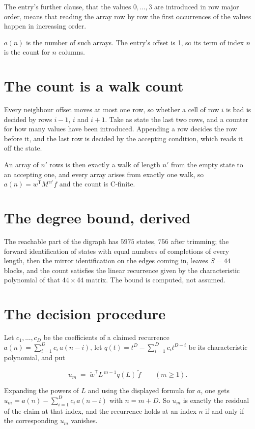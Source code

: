 \documentclass[11pt]{article}
\theoremstyle{definition}
\begin{document}
The entry's further clause, that the values $0,\dots,3$ are introduced in row major order, means that reading the array row by row the first occurrences of the values happen in increasing order.

$a(n)$ is the number of such arrays. The entry's offset is 1, so its term of index $n$ is the count for $n$ columns.

\section{The count is a walk count}

Every neighbour offset moves at most one row, so whether a cell of row $i$ is bad is decided by rows $i-1$, $i$ and $i+1$. Take as state the last two rows, and a counter for how many values have been introduced. Appending a row decides the row before it, and the last row is decided by the accepting condition, which reads it off the state.

An array of $n'$ rows is then exactly a walk of length $n'$ from the empty state to an accepting one, and every array arises from exactly one walk, so $a(n) = w^{\mathsf T}M^{\,n'}f$ and the count is C-finite.

\section{The degree bound, derived}

The reachable part of the digraph has $5975$ states, $756$ after trimming; the forward identification of states with equal numbers of completions of every length, then the mirror identification on the edges coming in, leaves $S = 44$ blocks, and the count satisfies the linear recurrence given by the characteristic polynomial of that $44\times44$ matrix. The bound is computed, not assumed.

\section{The decision procedure}

Let $c_1,\dots,c_D$ be the coefficients of a claimed recurrence $a(n) = \sum_{i=1}^{D} c_i\,a(n-i)$, let $q(t) = t^{D} - \sum_{i=1}^{D} c_i t^{D-i}$ be its characteristic polynomial, and put

\[u_m \;=\; \tilde w^{\mathsf T} L^{\,m-1} q(L)\,\tilde f \qquad (m \ge 1).\]

Expanding the powers of $L$ and using the displayed formula for $a$, one gets $u_m = a(n) - \sum_{i=1}^{D} c_i\,a(n-i)$ with $n = m + D$. So $u_m$ is exactly the residual of the claim at that index, and the recurrence holds at an index $n$ if and only if the corresponding $u_m$ vanishes.
\end{document}
